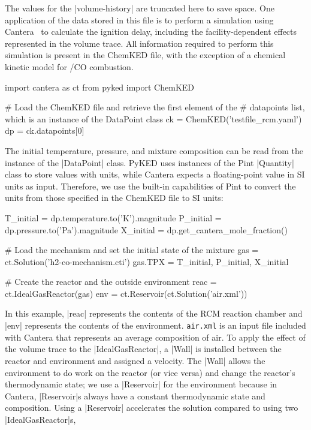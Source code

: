 \documentclass[12pt]{ijck}
\newcommand\ck{ChemKED}
\newcommand\pk{PyKED}
\begin{document}
%
The values for the \yabox|volume-history| are truncated here to save space. One application of the
data stored in this file is to perform a simulation using Cantera~\autocite{Cantera:2.3.0} to
calculate the ignition delay, including the facility-dependent effects represented in the volume
trace. All information required to perform this simulation is present in the \ck{} file, with the
exception of a chemical kinetic model for \slash {CO} combustion.
%
\begin{pythonbox}
import cantera as ct
from pyked import ChemKED

# Load the ChemKED file and retrieve the first element of the
# datapoints list, which is an instance of the DataPoint class
ck = ChemKED('testfile_rcm.yaml')
dp = ck.datapoints[0]
\end{pythonbox}
%
The initial temperature, pressure, and mixture composition can be read from the
instance of the \pybox|DataPoint| class. \pk{} uses instances of the Pint \pybox|Quantity| class to
store values with units, while Cantera expects a floating-point value in SI
units as input. Therefore, we use the built-in capabilities of Pint to convert
the units from those specified in the \ck{} file to SI units:
%
\begin{pythonbox}
T_initial = dp.temperature.to('K').magnitude
P_initial = dp.pressure.to('Pa').magnitude
X_initial = dp.get_cantera_mole_fraction()

# Load the mechanism and set the initial state of the mixture
gas = ct.Solution('h2-co-mechanism.cti')
gas.TPX = T_initial, P_initial, X_initial

# Create the reactor and the outside environment
reac = ct.IdealGasReactor(gas)
env = ct.Reservoir(ct.Solution('air.xml'))
\end{pythonbox}
%
In this example, \pybox|reac| represents the contents of the RCM reaction chamber and \pybox|env|
represents the contents of the environment. \verb|air.xml| is an input file included with Cantera
that represents an average composition of air. To apply the effect of the volume trace to the
\pybox|IdealGasReactor|, a \pybox|Wall| is installed between the reactor and environment and
assigned a velocity. The \pybox|Wall| allows the environment to do work on the reactor (or vice
versa) and change the reactor's thermodynamic state; we use a \pybox|Reservoir| for the environment
because in Cantera, \pybox|Reservoir|s always have a constant thermodynamic state and composition.
Using a \pybox|Reservoir| accelerates the solution compared to using two \pybox|IdealGasReactor|s,
\end{document}
